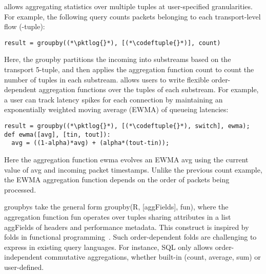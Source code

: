  \TheSystem allows
aggregating statistics over multiple tuples at user-specified
granularities. For example, the following query counts packets belonging to
each transport-level flow (-tuple):
\begin{lstlisting}
result = groupby((*\pktlog{}*), [(*\codeftuple{}*)], count)
\end{lstlisting}
Here, the {\ct groupby} partitions the incoming {\ct \pktlog} into substreams
based on the transport 5-tuple, and then applies the aggregation function {\ct
count} to count the number of tuples in each substream.  \TheSystem allows users to write
flexible order-dependent aggregation functions over the tuples of each substream. For example,
a user can track latency spikes for each connection by maintaining an
exponentially weighted moving average (EWMA) of queueing latencies:
\begin{lstlisting}
result = groupby((*\pktlog{}*), [(*\codeftuple{}*), switch], ewma);
def ewma([avg], [tin, tout]):
  avg = ((1-alpha)*avg) + (alpha*(tout-tin));
\end{lstlisting}
Here the aggregation function {\ct ewma} evolves an EWMA {\ct avg} using the
current value of {\ct avg} and incoming packet timestamps. Unlike the previous
{\ct count} example, the EWMA aggregation function depends on the order of
packets being processed.%

{\ct groupby}s take the general form {\ct groupby(R, [aggFields], fun)}, where
the aggregation function {\ct fun} operates over tuples sharing attributes in a
list {\ct aggFields} of headers and performance metadata. This construct is
inspired by folds in functional
programming~\cite{comprehensive-comprehensions}.  Such order-dependent folds
are challenging to express in existing query languages. For instance, SQL only
allows order-independent commutative aggregations, whether built-in (\eg count,
average, sum) or user-defined.

